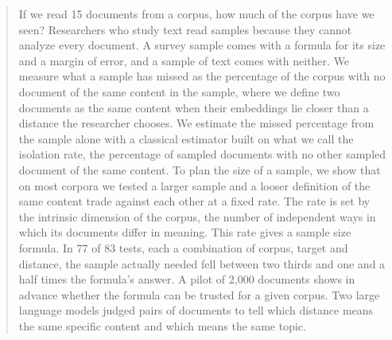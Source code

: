 \begin{abstract}
If we read 15 documents from a corpus, how much of the corpus have we seen? Researchers who study text read samples because they cannot analyze every document. A survey sample comes with a formula for its size and a margin of error, and a sample of text comes with neither. We measure what a sample has missed as the percentage of the corpus with no document of the same content in the sample, where we define two documents as the same content when their embeddings lie closer than a distance the researcher chooses. We estimate the missed percentage from the sample alone with a classical estimator built on what we call the isolation rate, the percentage of sampled documents with no other sampled document of the same content. To plan the size of a sample, we show that on most corpora we tested a larger sample and a looser definition of the same content trade against each other at a fixed rate. The rate is set by the intrinsic dimension of the corpus, the number of independent ways in which its documents differ in meaning. This rate gives a sample size formula. In 77 of 83 tests, each a combination of corpus, target and distance, the sample actually needed fell between two thirds and one and a half times the formula's answer. A pilot of 2{,}000 documents shows in advance whether the formula can be trusted for a given corpus. Two large language models judged pairs of documents to tell which distance means the same specific content and which means the same topic.
\end{abstract}
